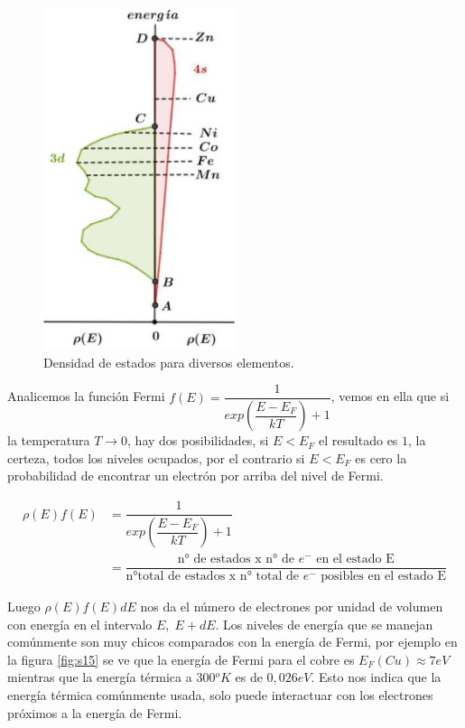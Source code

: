 \begin{figure}[H]
    \centering
    \includegraphics[width=0.5\textwidth]{./Figures/fig_s14}
	\caption{Densidad de estados para diversos elementos.}
	\label{fig:s14}
\end{figure}

Analicemos la función Fermi $f(E)=\dfrac{1}{exp \left(\dfrac{E-E_{F}}{kT}\right)+1 }$, vemos en ella que si la temperatura $T\rightarrow 0$, hay dos posibilidades, si $E < E_{F}$ el resultado es $1$, la certeza, todos los niveles ocupados, por el contrario si $E<E_{F}$ es cero la probabilidad de encontrar un electrón por arriba del nivel de Fermi.

\begin{equation}
\begin{aligned}
	\rho(E)f(E) &= \dfrac{1}{exp\left(\dfrac{E-E_{F}}{kT}\right)+1 } \\
	&= \dfrac{\text{n° de estados x n° de $e^{-}$ en el estado E}}{\text{n°total de estados x  n° total de $e^{-}$ posibles en el estado E}}	
\end{aligned}
\end{equation}


Luego $\rho(E)f(E)dE$ nos da el número de electrones por unidad de volumen con energía en el intervalo $E , \; E+dE$. Los niveles de energía que se manejan comúnmente son muy chicos comparados con la energía de Fermi, por ejemplo en la figura \ref{fig:s15} se ve que la energía de Fermi para el cobre es $E_{F}(Cu)\approx 7eV$ mientras que la energía térmica a $300{^{o}}K$ es de $0,026eV$. Esto nos indica que la energía térmica comúnmente usada, solo puede interactuar con los electrones próximos a la energía de Fermi.


